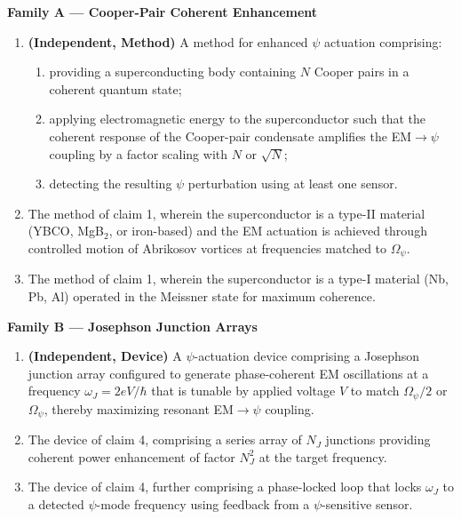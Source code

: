 \documentclass[12pt,letterpaper]{article}
\begin{document}
\begin{tcolorbox}[colback=blue!5!white, colframe=blue!50!black,
title=Patent \#17 -- Proposed Claims]

\textbf{Family A --- Cooper-Pair Coherent Enhancement}
\begin{enumerate}
\item \textbf{(Independent, Method)} A method for enhanced $\psi$
actuation comprising:
\begin{enumerate}[label=(\alph*)]
\item providing a superconducting body containing $N$ Cooper pairs
in a coherent quantum state;
\item applying electromagnetic energy to the superconductor such that
the coherent response of the Cooper-pair condensate amplifies the
EM$\to\psi$ coupling by a factor scaling with $N$ or $\sqrt{N}$;
\item detecting the resulting $\psi$ perturbation using at least one
sensor.
\end{enumerate}

\item The method of claim 1, wherein the superconductor is a type-II
material (YBCO, MgB$_2$, or iron-based) and the EM actuation is
achieved through controlled motion of Abrikosov vortices at
frequencies matched to $\Omega_\psi$.

\item The method of claim 1, wherein the superconductor is a type-I
material (Nb, Pb, Al) operated in the Meissner state for maximum
coherence.
\end{enumerate}

\textbf{Family B --- Josephson Junction Arrays}
\begin{enumerate}[resume]
\item \textbf{(Independent, Device)} A $\psi$-actuation device comprising
a Josephson junction array configured to generate phase-coherent EM
oscillations at a frequency $\omega_J = 2eV/\hbar$ that is tunable
by applied voltage $V$ to match $\Omega_\psi/2$ or $\Omega_\psi$,
thereby maximizing resonant EM$\to\psi$ coupling.

\item The device of claim 4, comprising a series array of $N_J$
junctions providing coherent power enhancement of factor $N_J^2$
at the target frequency.

\item The device of claim 4, further comprising a phase-locked loop
that locks $\omega_J$ to a detected $\psi$-mode frequency using
feedback from a $\psi$-sensitive sensor.
\end{enumerate}


\end{tcolorbox}
\end{document}
